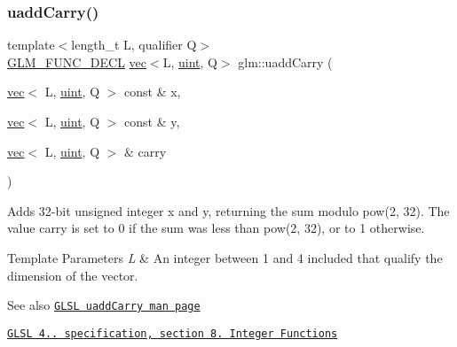 \subsubsection{\texorpdfstring{uadd\+Carry()}{uaddCarry()}}
{\footnotesize\ttfamily template$<$length\+\_\+t L, qualifier Q$>$ \\
\mbox{\hyperlink{setup_8hpp_ab2d052de21a70539923e9bcbf6e83a51}{G\+L\+M\+\_\+\+F\+U\+N\+C\+\_\+\+D\+E\+CL}} \mbox{\hyperlink{structglm_1_1vec}{vec}}$<$L, \mbox{\hyperlink{group__core__precision_ga4fd29415871152bfb5abd588334147c8}{uint}}, Q$>$ glm\+::uadd\+Carry (\begin{DoxyParamCaption}\item[{\mbox{\hyperlink{structglm_1_1vec}{vec}}$<$ L, \mbox{\hyperlink{group__core__precision_ga4fd29415871152bfb5abd588334147c8}{uint}}, Q $>$ const \&}]{x,  }\item[{\mbox{\hyperlink{structglm_1_1vec}{vec}}$<$ L, \mbox{\hyperlink{group__core__precision_ga4fd29415871152bfb5abd588334147c8}{uint}}, Q $>$ const \&}]{y,  }\item[{\mbox{\hyperlink{structglm_1_1vec}{vec}}$<$ L, \mbox{\hyperlink{group__core__precision_ga4fd29415871152bfb5abd588334147c8}{uint}}, Q $>$ \&}]{carry }\end{DoxyParamCaption})}

Adds 32-\/bit unsigned integer x and y, returning the sum modulo pow(2, 32). The value carry is set to 0 if the sum was less than pow(2, 32), or to 1 otherwise.


\begin{DoxyTemplParams}{Template Parameters}
{\em L} & An integer between 1 and 4 included that qualify the dimension of the vector.\\
\hline
\end{DoxyTemplParams}
\begin{DoxySeeAlso}{See also}
\href{http://www.opengl.org/sdk/docs/manglsl/xhtml/uaddCarry.xml}{\tt G\+L\+SL uadd\+Carry man page} 

\href{http://www.opengl.org/registry/doc/GLSLangSpec.4.20.8.pdf}{\tt G\+L\+SL 4.. specification, section 8. Integer Functions} 
\end{DoxySeeAlso}
\mbox{\label{group__core__func__integer_ga732e2fb56db57ea541c7e5c92b7121be}} 
